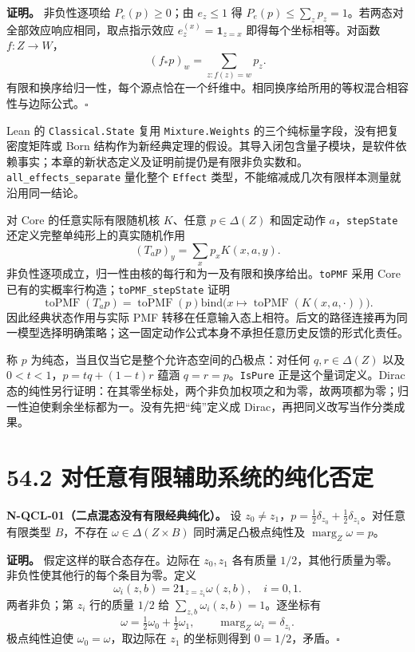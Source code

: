 \documentclass[
  11pt,
  oneside]{book}
\begin{document}
\textbf{证明。} 非负性逐项给 \(P_e(p)\ge0\)；由 \(e_z\le1\) 得
\(P_e(p)\le\sum_zp_z=1\)。若两态对全部效应响应相同，取点指示效应
\(e^{(x)}_z=\mathbf1_{z=x}\) 即得每个坐标相等。对函数 \(f:Z\to W\)， \[
(f_*p)_w=\sum_{z:f(z)=w}p_z.
\]
有限和换序给归一性，每个源点恰在一个纤维中。相同换序给所用的等权混合相容性与边际公式。\(\square\)

Lean 的 \texttt{Classical.\allowbreak State} 复用 \texttt{Mixture.\allowbreak Weights}
的三个纯标量字段，没有把复密度矩阵或 Born
结构作为新经典定理的假设。其导入闭包含量子模块，是软件依赖事实；本章的新状态定义及证明前提仍是有限非负实数和。\texttt{all\_\allowbreak effects\_\allowbreak separate}
量化整个 \texttt{Effect}
类型，不能缩减成几次有限样本测量就沿用同一结论。

对 Core 的任意实际有限随机核 \(K\)、任意 \(p\in\Delta(Z)\) 和固定动作
\(a\)，\texttt{step\allowbreak State} 还定义完整单纯形上的真实随机作用 \[
(T_ap)_y=\sum_xp_xK(x,a,y).
\]
非负性逐项成立，归一性由核的每行和为一及有限和换序给出。\texttt{to\allowbreak PMF}
采用 Core 已有的实概率行构造；\texttt{to\allowbreak PMF\_\allowbreak step\allowbreak State} 证明 \[
\operatorname{toPMF}(T_ap)
=\operatorname{toPMF}(p)\mathbin{\mathrm{bind}}
\bigl(x\mapsto\operatorname{toPMF}(K(x,a,\cdot))\bigr).
\] 因此经典状态作用与实际 PMF
转移在任意输入态上相符。后文的路径连接再为同一模型选择明确策略；这一固定动作公式本身不承担任意历史反馈的形式化责任。

称 \(p\) 为纯态，当且仅当它是整个允许态空间的凸极点：对任何
\(q,r\in\Delta(Z)\) 以及 \(0<t<1\)，\(p=tq+(1-t)r\) 蕴涵
\(q=r=p\)。\texttt{Is\allowbreak Pure} 正是这个量词定义。Dirac
态的纯性另行证明：在其零坐标处，两个非负加权项之和为零，故两项都为零；归一性迫使剩余坐标都为一。没有先把``纯''定义成
Dirac，再把同义改写当作分类成果。

\section{54.2 对任意有限辅助系统的纯化否定}

\protect\hypertarget{n-qcl-01}{}{}

\textbf{N-QCL-01（二点混态没有有限经典纯化）。} 设
\(z_0\ne z_1\)，\(p=\tfrac12\delta_{z_0}+\tfrac12\delta_{z_1}\)。对任意有限类型
\(B\)，不存在 \(\omega\in\Delta(Z\times B)\) 同时满足凸极点纯性及
\(\operatorname{marg}_Z\omega=p\)。

\textbf{证明。} 假定这样的联合态存在。边际在 \(z_0,z_1\) 各有质量
\(1/2\)，其他行质量为零。非负性使其他行的每个条目为零。定义 \[
\omega_i(z,b)=2\mathbf1_{z=z_i}\omega(z,b),\quad i=0,1.
\] 两者非负；第 \(z_i\) 行的质量 \(1/2\) 给
\(\sum_{z,b}\omega_i(z,b)=1\)。逐坐标有 \[
\omega=\tfrac12\omega_0+\tfrac12\omega_1,
\qquad \operatorname{marg}_Z\omega_i=\delta_{z_i}.
\] 极点纯性迫使 \(\omega_0=\omega\)，取边际在 \(z_1\) 的坐标则得到
\(0=1/2\)，矛盾。\(\square\)
\end{document}
